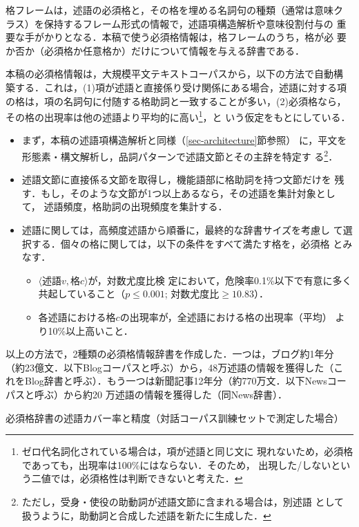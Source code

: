 \documentclass[japanese]{jnlp_1.4}
\begin{document}
格フレームは，述語の必須格と，その格を埋める名詞句の種類（通常は意味ク
  ラス）を保持するフレーム形式の情報で，述語項構造解析や意味役割付与の
重要な手がかりとなる．本稿で使う必須格情報は，格フレームのうち，格が必
要か否か（必須格か任意格か）だけについて情報を与える辞書である．

本稿の必須格情報は，大規模平文テキストコーパスから，以下の方法で自動構
築する．これは，(1)項が述語と直接係り受け関係にある場合，述語に対する項
の格は，項の名詞句に付随する格助詞と一致することが多い，(2)必須格なら，
その格の出現率は他の述語より平均的に高い\footnote{ゼロ代名詞化されている場合は，項が述語と同じ文に
現れないため，必須格であっても，出現率は100\%にはならない．そのため，
出現した/しないという二値では，必須格性は判断できないと考えた．}，と
いう仮定をもとにしている．

\begin{itemize}
\item まず，本稿の述語項構造解析と同様（\ref{sec-architecture}節参照）
に，平文を形態素・構文解析し，品詞パターンで述語文節とその主辞を特定す
る\footnote{ただし，受身・使役の助動詞が述語文節に含まれる場合は，別述語
として扱うように，助動詞と合成した述語を新たに生成した．}．
\item 述語文節に直接係る文節を取得し，機能語部に格助詞を持つ文節だけを
残す．もし，そのような文節が1つ以上あるなら，その述語を集計対象として，
述語頻度，格助詞の出現頻度を集計する．
\item 述語に関しては，高頻度述語から順番に，最終的な辞書サイズを考慮し
て選択する．個々の格に関しては，以下の条件をすべて満たす格を，必須格
とみなす．
  \begin{itemize}
  \item $\langle \text{述語}v, \text{格}c \rangle$が，対数尤度比検
  定において，危険率0.1\%以下で有意に多く共起していること（$p \leq
  0.001$; $\text{対数尤度比} \geq 10.83$）．
  \item 各述語における格$c$の出現率が，全述語における格の出現率（平均）
  より10\%以上高いこと．
  \end{itemize}
\end{itemize}

以上の方法で，2種類の必須格情報辞書を作成した．一つは，ブログ約1年分
（約23億文．以下Blogコーパスと呼ぶ）から，48万述語の情報を獲得した（こ
れをBlog辞書と呼ぶ）．もう一つは新聞記事12年分（約770万文．以下Newsコー
パスと呼ぶ）から約20 万述語の情報を獲得した（同News辞書）．

\begin{table}[b]
\caption{必須格辞書の述語カバー率と精度（対話コーパス訓練セットで測定した場合）}
\label{tbl-oci-dict}

\end{table}
\end{document}
